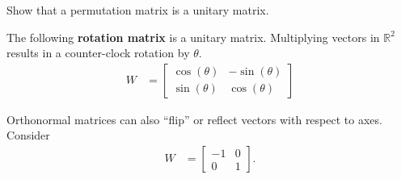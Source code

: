 \documentclass[a4paper,11pt]{exam}
\newcounter{ct}
\newcommand{\inv}{^{-1}}
\newcommand{\ctrp}{{^\dagger}} %
\newcommand{\field}[1]{\ensuremath{\mathbb{#1}}}
\newcommand{\reals}{\field{R}}
\begin{document}
\begin{questions}
\question Show that a permutation matrix is a unitary matrix.


\clearpage
\question The following \textbf{rotation matrix} is a unitary matrix. Multiplying vectors in $\reals^2$ results in a counter-clock rotation by $\theta$.
\begin{align}\label{eq:LA:rotation}
    W &=
    \begin{bmatrix}
	\cos(\theta) & -\sin(\theta)\\
	\sin(\theta) & \cos(\theta)
    \end{bmatrix}
\end{align}

\question Orthonormal matrices can also ``flip'' or reflect vectors with respect to axes. Consider
\begin{align}\label{eq:LA:flip}
    W &=
    \begin{bmatrix}
	-1 & 0\\
	 0 & 1
    \end{bmatrix}.
\end{align}


\end{questions}
\end{document}

